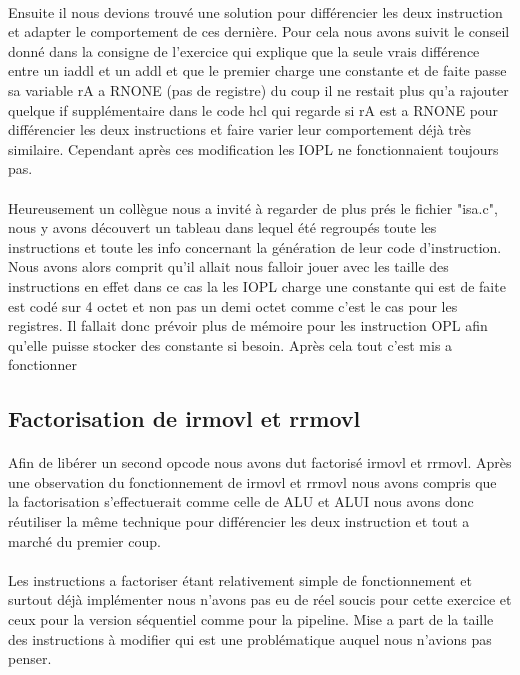 \documentclass[12pt]{article}
\begin{document}
\paragraph{}Ensuite il nous devions trouvé une solution pour différencier les deux instruction
et adapter le comportement de ces dernière. Pour cela nous avons suivit le conseil
donné dans la consigne de l’exercice qui explique que la seule vrais différence entre un iaddl et un addl et que le premier charge une constante et de faite passe sa variable rA a RNONE (pas de registre) du coup il ne restait plus qu'a rajouter quelque if supplémentaire dans le code hcl qui regarde si rA est a RNONE pour différencier les deux instructions et faire varier leur comportement déjà très similaire. Cependant après ces modification les IOPL ne fonctionnaient toujours pas.

\paragraph{}Heureusement un collègue nous a invité à regarder de plus prés le fichier "isa.c", nous y avons découvert un tableau dans lequel été regroupés toute les instructions
et toute les info concernant la génération de leur code d'instruction. Nous avons alors comprit qu'il allait nous falloir jouer avec les taille des instructions en
effet dans ce cas la les IOPL charge une constante qui est de faite est codé sur
4 octet et non pas un demi octet comme c’est le cas pour les registres. Il fallait donc prévoir plus de mémoire pour les instruction OPL afin qu'elle puisse stocker des constante si besoin. Après cela tout c'est mis a fonctionner


\subsection{Factorisation de irmovl et rrmovl}
\paragraph{}Afin de libérer un second opcode nous avons dut factorisé irmovl et rrmovl.
Après une observation du fonctionnement de irmovl et rrmovl nous avons compris que la factorisation s’effectuerait comme celle de ALU et ALUI nous avons donc réutiliser la même technique pour différencier les deux instruction et tout a marché du premier coup.

\paragraph{}Les instructions a factoriser étant relativement simple de fonctionnement et surtout déjà implémenter nous n'avons pas eu de réel soucis pour cette exercice et ceux pour la version séquentiel comme pour la pipeline. Mise a part de la taille des instructions à modifier qui est une problématique auquel nous n'avions pas penser.
\end{document}
